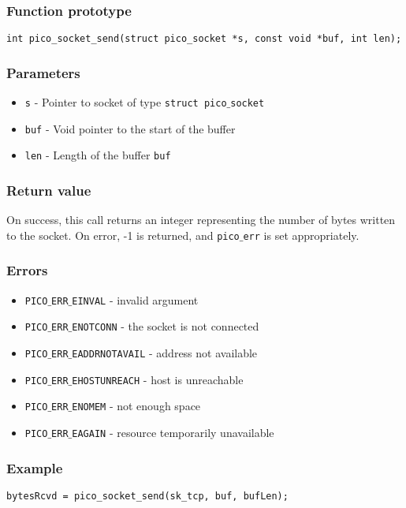 \subsubsection*{Function prototype}
\begin{verbatim}
int pico_socket_send(struct pico_socket *s, const void *buf, int len);
\end{verbatim}


\subsubsection*{Parameters}
\begin{itemize}[noitemsep]
\item \texttt{s} - Pointer to socket of type \texttt{struct pico$\_$socket}
\item \texttt{buf} - Void pointer to the start of the buffer
\item \texttt{len} - Length of the buffer \texttt{buf}
\end{itemize}

\subsubsection*{Return value}
On success, this call returns an integer representing the number of bytes written to
the socket. On error, -1 is returned, and \texttt{pico$\_$err} is set appropriately.

\subsubsection*{Errors}
\begin{itemize}[noitemsep]
\item \texttt{PICO$\_$ERR$\_$EINVAL} - invalid argument
\item \texttt{PICO$\_$ERR$\_$ENOTCONN} - the socket is not connected
\item \texttt{PICO$\_$ERR$\_$EADDRNOTAVAIL} - address not available
\item \texttt{PICO$\_$ERR$\_$EHOSTUNREACH} - host is unreachable
\item \texttt{PICO$\_$ERR$\_$ENOMEM} - not enough space
\item \texttt{PICO$\_$ERR$\_$EAGAIN} - resource temporarily unavailable
\end{itemize}

\subsubsection*{Example}
\begin{verbatim}
bytesRcvd = pico_socket_send(sk_tcp, buf, bufLen);
\end{verbatim}


